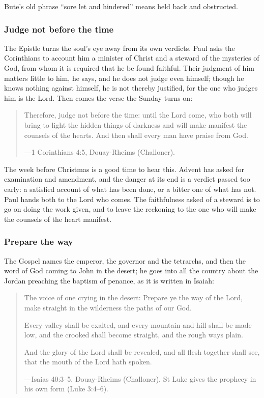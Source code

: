 Bute's old phrase ``sore let and hindered'' means held back and obstructed.

\subsubsection{Judge not before the time}

The Epistle turns the soul's eye away from its own verdicts. Paul asks the Corinthians to account
him a minister of Christ and a steward of the mysteries of God, from whom it is required that he
be found faithful. Their judgment of him matters little to him, he says, and he does not judge
even himself; though he knows nothing against himself, he is not thereby justified, for the one
who judges him is the Lord. Then comes the verse the Sunday turns on:

\begin{quote}
Therefore, judge not before the time: until the Lord come, who both will bring to light the
hidden things of darkness and will make manifest the counsels of the hearts. And then shall every
man have praise from God.\par
{\smallskip\noindent\small ---1 Corinthians 4:5, Douay-Rheims (Challoner).\par}
\end{quote}

The week before Christmas is a good time to hear this. Advent has asked for examination and
amendment, and the danger at its end is a verdict passed too early: a satisfied account of what
has been done, or a bitter one of what has not. Paul hands both to the Lord who comes. The
faithfulness asked of a steward is to go on doing the work given, and to leave the reckoning to
the one who will make the counsels of the heart manifest.

\subsubsection{Prepare the way}

The Gospel names the emperor, the governor and the tetrarchs, and then the word of God coming to
John in the desert; he goes into all the country about the Jordan preaching the baptism of
penance, as it is written in Isaiah:

\begin{quote}
The voice of one crying in the desert: Prepare ye the way of the Lord, make straight in the
wilderness the paths of our God.

Every valley shall be exalted, and every mountain and hill shall be made low, and the crooked
shall become straight, and the rough ways plain.

And the glory of the Lord shall be revealed, and all flesh together shall see, that the mouth of
the Lord hath spoken.\par
{\smallskip\noindent\small ---Isaias 40:3--5, Douay-Rheims (Challoner). St Luke gives the
prophecy in his own form (Luke 3:4--6).\par}
\end{quote}

